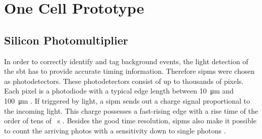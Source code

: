 \chapter{One Cell Prototype}




%
%

\section{Silicon Photomultiplier}
In order to correctly identify and tag background events, the light detection of the \ac{sbt} has to provide accurate timing information.
Therefore \acp{sipm} were chosen as photodetectors.
These photodetectors consist of up to thousands of pixels.
Each pixel is a photodiode with a typical edge length between \SI{10}{\micro\meter} and \SI{100}{\micro\meter} \cite{nucl}.
If triggered by light, a \ac{sipm} sends out a charge signal proportional to the incoming light.
This charge possesses a fast-rising edge with a rise time of the order of tens of \si{\piko\second} \cite{nucl}.
Besides the good time resolution, \acp{sipm} also make it possible to count the arriving photos with a sensitivity down to single photons \cite{HAMA_mppc}.


